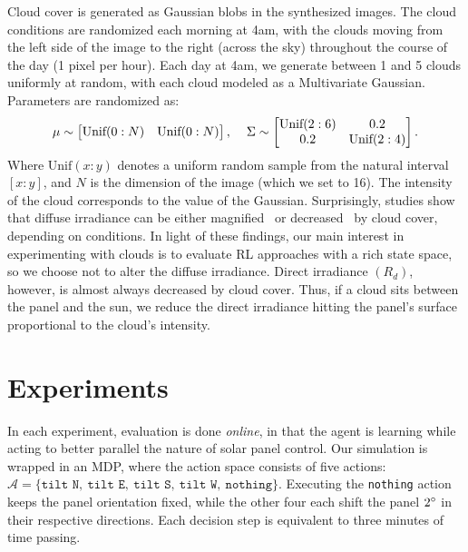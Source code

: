 \documentclass{article}
\newcommand{\mc}{\mathcal}
\begin{document}
Cloud cover is generated as Gaussian blobs in the synthesized images. The cloud conditions are randomized each morning at 4am, with the clouds moving from the left side of the image to the right (across the sky) throughout the course of the day (1 pixel per hour). Each day at 4am, we generate between 1 and 5 clouds uniformly at random, with each cloud modeled as a Multivariate Gaussian. Parameters are randomized as:
\begin{align}
\mu \sim \begin{bmatrix}
\text{Unif}(0:N)&  \text{Unif}(0:N) \\
\end{bmatrix}, \hspace{4mm}
\Sigma \sim \begin{bmatrix}
\text{Unif}(2:6)&0.2 \\
0.2&\text{Unif}(2:4) \\
\end{bmatrix}.
\end{align}
Where $\text{Unif}(x:y)$ denotes a uniform random sample from the natural interval $[x:y]$, and $N$ is the dimension of the image (which we set to 16). The intensity of the cloud corresponds to the value of the Gaussian. Surprisingly, studies show that diffuse irradiance can be either magnified~\cite{robinson1966solar} or decreased~\cite{pfister2003cloud} by cloud cover, depending on conditions. In light of these findings, our main interest in experimenting with clouds is to evaluate RL approaches with a rich state space, so we choose not to alter the diffuse irradiance. Direct irradiance $(R_d)$, however, is almost always decreased by cloud cover. Thus, if a cloud sits between the panel and the sun, we reduce the direct irradiance hitting the panel's surface proportional to the cloud's intensity. %



\section{Experiments}

In each experiment, evaluation is done {\it online}, in that the agent is learning while acting to better parallel the nature of solar panel control. Our simulation is wrapped in an MDP, where the action space consists of five actions: $\mc{A} = \{\texttt{tilt N},\ \texttt{tilt E},\ \texttt{tilt S},\ \texttt{tilt W},\ \texttt{nothing}\}$. Executing the \texttt{nothing} action keeps the panel orientation fixed, while the other four each shift the panel $2\degree$ in their respective directions. Each decision step is equivalent to three minutes of time passing.
\end{document}
